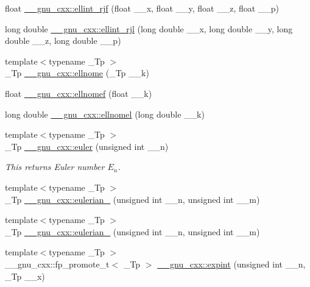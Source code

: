 \begin{DoxyCompactItemize}
\item 
float \hyperlink{group__gnu__math__spec__func_gace85b5190b04f57493878c5d672cfabd}{\+\_\+\+\_\+gnu\+\_\+cxx\+::ellint\+\_\+rjf} (float \+\_\+\+\_\+x, float \+\_\+\+\_\+y, float \+\_\+\+\_\+z, float \+\_\+\+\_\+p)
\item 
long double \hyperlink{group__gnu__math__spec__func_gab5405f1669b3ce8b560dc33aa5b97287}{\+\_\+\+\_\+gnu\+\_\+cxx\+::ellint\+\_\+rjl} (long double \+\_\+\+\_\+x, long double \+\_\+\+\_\+y, long double \+\_\+\+\_\+z, long double \+\_\+\+\_\+p)
\item 
{\footnotesize template$<$typename \+\_\+\+Tp $>$ }\\\+\_\+\+Tp \hyperlink{group__gnu__math__spec__func_ga7bfb34f8b5c0ed7c72040f9cb7034bba}{\+\_\+\+\_\+gnu\+\_\+cxx\+::ellnome} (\+\_\+\+Tp \+\_\+\+\_\+k)
\item 
float \hyperlink{group__gnu__math__spec__func_gad3ba08e5843ea0ec2bb9ddde3033adff}{\+\_\+\+\_\+gnu\+\_\+cxx\+::ellnomef} (float \+\_\+\+\_\+k)
\item 
long double \hyperlink{group__gnu__math__spec__func_ga0774570b24f654f8ae39e1865613a4e2}{\+\_\+\+\_\+gnu\+\_\+cxx\+::ellnomel} (long double \+\_\+\+\_\+k)
\item 
{\footnotesize template$<$typename \+\_\+\+Tp $>$ }\\\+\_\+\+Tp \hyperlink{group__gnu__math__spec__func_gac956e6457ab7d0d1765d281e73073f55}{\+\_\+\+\_\+gnu\+\_\+cxx\+::euler} (unsigned int \+\_\+\+\_\+n)
\begin{DoxyCompactList}\small\item\em This returns Euler number $ E_n $. \end{DoxyCompactList}\item 
{\footnotesize template$<$typename \+\_\+\+Tp $>$ }\\\+\_\+\+Tp \hyperlink{group__gnu__math__spec__func_gadfd8810a97655d2cdd1b0e3af68a79d3}{\+\_\+\+\_\+gnu\+\_\+cxx\+::eulerian\+\_} (unsigned int \+\_\+\+\_\+n, unsigned int \+\_\+\+\_\+m)
\item 
{\footnotesize template$<$typename \+\_\+\+Tp $>$ }\\\+\_\+\+Tp \hyperlink{group__gnu__math__spec__func_ga9bc456941d5e35cf54ec9c50f2e52884}{\+\_\+\+\_\+gnu\+\_\+cxx\+::eulerian\+\_} (unsigned int \+\_\+\+\_\+n, unsigned int \+\_\+\+\_\+m)
\item 
{\footnotesize template$<$typename \+\_\+\+Tp $>$ }\\\+\_\+\+\_\+gnu\+\_\+cxx\+::fp\+\_\+promote\+\_\+t$<$ \+\_\+\+Tp $>$ \hyperlink{group__gnu__math__spec__func_gadaf9317953b826975da72d1858f01ea5}{\+\_\+\+\_\+gnu\+\_\+cxx\+::expint} (unsigned int \+\_\+\+\_\+n, \+\_\+\+Tp \+\_\+\+\_\+x)

\end{DoxyCompactItemize}
